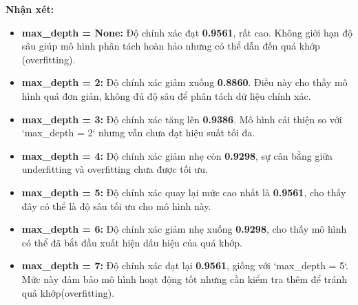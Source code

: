 \textbf{Nhận xét:}
\begin{itemize}
	\item \textbf{max\_depth = None:} Độ chính xác đạt \textbf{0.9561}, rất cao. Không giới hạn độ sâu giúp mô hình phân tách hoàn hảo nhưng có thể dẫn đến quá khớp (overfitting).
	
	\item \textbf{max\_depth = 2:} Độ chính xác giảm xuống \textbf{0.8860}. Điều này cho thấy mô hình quá đơn giản, không đủ độ sâu để phân tách dữ liệu chính xác.
	
	\item \textbf{max\_depth = 3:} Độ chính xác tăng lên \textbf{0.9386}. Mô hình cải thiện so với `max\_depth = 2` nhưng vẫn chưa đạt hiệu suất tối đa.
	
	\item \textbf{max\_depth = 4:} Độ chính xác giảm nhẹ còn \textbf{0.9298}, sự cân bằng giữa underfitting và overfitting chưa được tối ưu.
	
	\item \textbf{max\_depth = 5:} Độ chính xác quay lại mức cao nhất là \textbf{0.9561}, cho thấy đây có thể là độ sâu tối ưu cho mô hình này.
	
	\item \textbf{max\_depth = 6:} Độ chính xác giảm nhẹ xuống \textbf{0.9298}, cho thấy mô hình có thể đã bắt đầu xuất hiện dấu hiệu của quá khớp.
	
	\item \textbf{max\_depth = 7:} Độ chính xác đạt lại \textbf{0.9561}, giống với `max\_depth = 5`. Mức này đảm bảo mô hình hoạt động tốt nhưng cần kiểm tra thêm để tránh quá khớp(overfitting).
\end{itemize}

